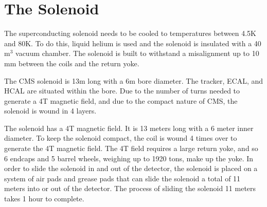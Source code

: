 
\vspace{-3pt}
\section{The Solenoid}\label{sec:ch3:solenoid}


The superconducting solenoid needs to be cooled to temperatures between 4.5K and 80K. To do this, liquid helium is used and the solenoid is insulated with a 40 m$^3$ vacuum chamber. The solenoid is built to withstand a misalignment up to 10 mm between the coils and the return yoke.

The CMS solenoid is 13m long with a 6m bore diameter. The tracker, ECAL, and HCAL are situated within the bore. Due to the number of turns needed to generate a 4T magnetic field, and due to the compact nature of CMS, the solenoid is wound in 4 layers.

The solenoid has a 4T magnetic field. It is 13 meters long with a 6 meter inner diameter. To keep the solenoid compact, the coil is wound 4 times over to generate the 4T magnetic field. The 4T field requires a large return yoke, and so 6 endcaps and 5 barrel wheels, weighing up to 1920 tons, make up the yoke. In order to slide the solenoid in and out of the detector, the solenoid is placed on a system of air pads and grease pads that can slide the solenoid a total of 11 meters into or out of the detector. The process of sliding the solenoid 11 meters takes 1 hour to complete.
